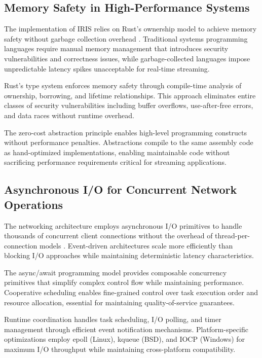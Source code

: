 \subsection{Memory Safety in High-Performance Systems}

The implementation of IRIS relies on Rust's ownership model to achieve memory safety without garbage collection overhead \cite{matsakis2014rust}. Traditional systems programming languages require manual memory management that introduces security vulnerabilities and correctness issues, while garbage-collected languages impose unpredictable latency spikes unacceptable for real-time streaming.

Rust's type system enforces memory safety through compile-time analysis of ownership, borrowing, and lifetime relationships. This approach eliminates entire classes of security vulnerabilities including buffer overflows, use-after-free errors, and data races without runtime overhead.

The zero-cost abstraction principle enables high-level programming constructs without performance penalties. Abstractions compile to the same assembly code as hand-optimized implementations, enabling maintainable code without sacrificing performance requirements critical for streaming applications.

\subsection{Asynchronous I/O for Concurrent Network Operations}

The networking architecture employs asynchronous I/O primitives to handle thousands of concurrent client connections without the overhead of thread-per-connection models \cite{tokio2023async}. Event-driven architectures scale more efficiently than blocking I/O approaches while maintaining deterministic latency characteristics.

The async/await programming model provides composable concurrency primitives that simplify complex control flow while maintaining performance. Cooperative scheduling enables fine-grained control over task execution order and resource allocation, essential for maintaining quality-of-service guarantees.

Runtime coordination handles task scheduling, I/O polling, and timer management through efficient event notification mechanisms. Platform-specific optimizations employ epoll (Linux), kqueue (BSD), and IOCP (Windows) for maximum I/O throughput while maintaining cross-platform compatibility.
